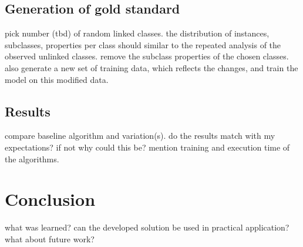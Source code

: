 \documentclass{scrartcl} %
\begin{document}
\subsection{Generation of gold standard}
pick number (tbd) of random linked classes. the distribution of instances, subclasses, properties per class should
similar to the repeated analysis of the observed unlinked classes. remove the subclass properties of the chosen classes.
also generate a new set of training data, which reflects the changes, and train the model on this modified data.

\subsection{Results}
compare baseline algorithm and variation(s). do the results match with my expectations? if not why could
this be? mention training and execution time of the algorithms. 

\section{Conclusion}
what was learned? can the developed solution be used in practical application? what about future work?
\end{document}
